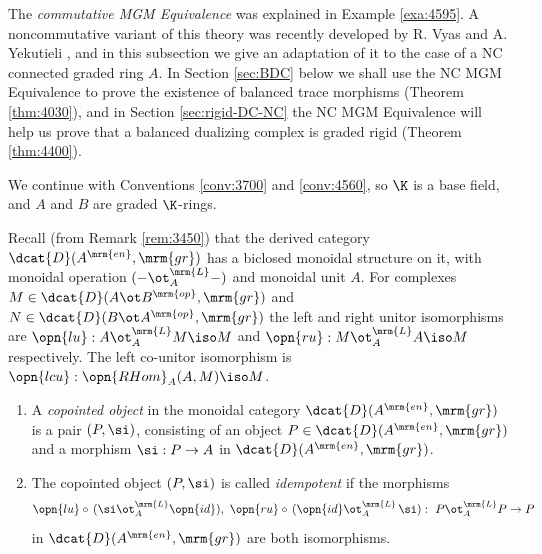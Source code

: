 \label{subsec:NC-MGM}

The {\em commutative MGM Equivalence} was \lb explained in Example 
\ref{exa:4595}.
A noncommutative variant of this theory was recently developed by 
R. Vyas and A. Yekutieli \cite{VyYe}, and in this subsection we give an 
adaptation of it to the case of a NC connected graded ring $A$. 
In Section \ref{sec:BDC} below we shall use the NC MGM Equivalence to prove the
existence of balanced trace morphisms (Theorem \ref{thm:4030}), and in Section 
\ref{sec:rigid-DC-NC} the NC MGM Equivalence will help us prove that a balanced 
dualizing complex is graded rigid (Theorem \ref{thm:4400}). 

We continue with Conventions \ref{conv:3700} and \ref{conv:4560}, so $\K$ is a 
base field, and $A$ and $B$ are graded $\K$-rings.

Recall (from Remark \ref{rem:3450}) that the derived category 
$\dcat{D}(A^{\mrm{en}}, \mrm{gr})$ has a biclosed monoidal structure on it, 
with monoidal operation $(- \ot^{\mrm{L}}_{A} -)$ and monoidal unit $A$.
For complexes 
$M \in \dcat{D}(A \ot B^{\mrm{op}}, \mrm{gr})$
and 
$N \in \dcat{D}(B \ot A^{\mrm{op}}, \mrm{gr})$
the left and right unitor isomorphisms are%
% 
%
% 
$\opn{lu} : A \ot^{\mrm{L}}_{A} M \iso M$ 
and
$\opn{ru} : M \ot^{\mrm{L}}_{A} A \iso M$
respectively. The left co-unitor isomorphism%
% 
is $\opn{lcu} : \opn{RHom}_{A}(A, M) \iso M$.

\begin{dfn} \label{dfn:3995} \mbox{}
\begin{enumerate}
\item A {\em copointed object}%
in the monoidal category 
$\dcat{D}(A^{\mrm{en}}, \mrm{gr})$ 
is a pair $(P, \si)$, consisting of an object 
$P \in \dcat{D}(A^{\mrm{en}}, \mrm{gr})$ and a morphism 
$\si : P \to A$ in $\dcat{D}(A^{\mrm{en}}, \mrm{gr})$.

\item The copointed object $(P, \si)$ is called 
{\em idempotent}%
if the morphisms 
\[  \opn{lu} \circ \, (\si \ot^{\mrm{L}}_A \opn{id}) , \ 
\opn{ru} \circ \, (\opn{id}  \ot^{\mrm{L}}_A \, \si) : 
\ P \ot_A^{\mrm{L}} P \to P \]
in $\dcat{D}(A^{\mrm{en}}, \mrm{gr})$ are both isomorphisms.
\end{enumerate}
\end{dfn}

